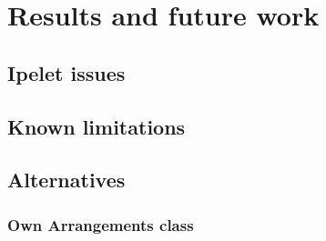 \documentclass[11pt,a4paper,english]{article}
\begin{document}
	
	\section{Results and future work}
	
	\subsection{Ipelet issues}
	
	\subsection{Known limitations}
	
	\subsection{Alternatives}
	
	\subsubsection{}
	
	\subsubsection{Own Arrangements class}
	
\end{document}
